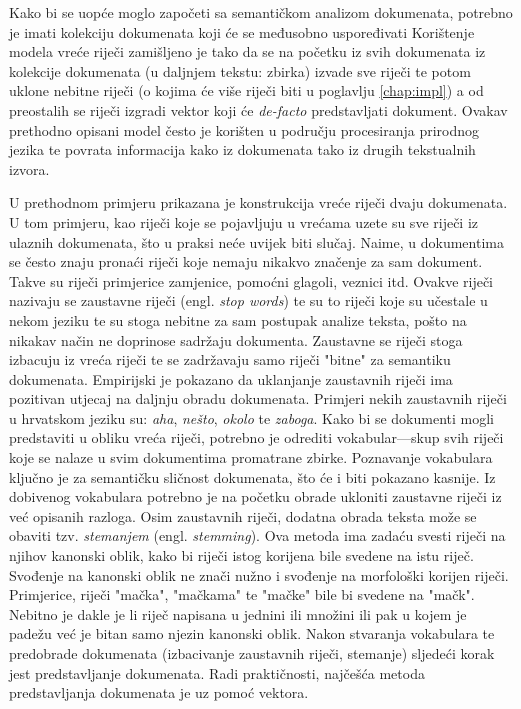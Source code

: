 \documentclass[times, utf8, zavrsni]{fer}
\begin{document}
Kako bi se uopće moglo započeti sa semantičkom analizom dokumenata, potrebno je imati kolekciju dokumenata koji će se međusobno uspoređivati
Korištenje modela vreće riječi zamišljeno je tako da se na početku iz svih dokumenata iz kolekcije dokumenata (u daljnjem tekstu: zbirka) izvade sve riječi te potom uklone nebitne riječi (o kojima će više riječi biti u poglavlju \ref{chap:impl}) a od preostalih se riječi izgradi vektor koji će \textit{de-facto} predstavljati dokument. Ovakav prethodno opisani model često je korišten u području procesiranja prirodnog jezika te povrata informacija kako iz dokumenata tako iz drugih tekstualnih izvora.

U prethodnom primjeru prikazana je konstrukcija vreće riječi dvaju dokumenata. U tom primjeru, kao riječi koje se pojavljuju u vrećama uzete su sve riječi iz ulaznih dokumenata, što u praksi neće uvijek biti slučaj. Naime, u dokumentima se često znaju pronaći riječi koje nemaju nikakvo značenje za sam dokument. Takve su riječi primjerice zamjenice, pomoćni glagoli, veznici itd. Ovakve riječi nazivaju se zaustavne riječi (engl. \textit{stop words}) te su to riječi koje su učestale u nekom jeziku te su stoga nebitne za sam postupak analize teksta, pošto na nikakav način ne doprinose sadržaju dokumenta. Zaustavne se riječi stoga izbacuju iz vreća riječi te se zadržavaju samo riječi "bitne" za semantiku dokumenata. Empirijski je pokazano da uklanjanje zaustavnih riječi ima pozitivan utjecaj na daljnju obradu dokumenata. Primjeri nekih zaustavnih riječi u hrvatskom jeziku su: \textit{aha}, \textit{nešto}, \textit{okolo} te \textit{zaboga}.
Kako bi se dokumenti mogli predstaviti u obliku vreća riječi, potrebno je odrediti vokabular—skup svih riječi koje se nalaze u svim dokumentima promatrane zbirke. Poznavanje vokabulara ključno je za semantičku sličnost dokumenata, što će i biti pokazano kasnije. Iz dobivenog vokabulara potrebno je na početku obrade ukloniti zaustavne riječi iz već opisanih razloga. Osim zaustavnih riječi, dodatna obrada teksta može se obaviti tzv. \textit{stemanjem} (engl. \textit{stemming}). Ova metoda ima zadaću svesti riječi na njihov kanonski oblik, kako bi riječi istog korijena bile svedene na istu riječ. Svođenje na kanonski oblik ne znači nužno i svođenje na morfološki korijen riječi. Primjerice, riječi "mačka", "mačkama" te "mačke" bile bi svedene na "mačk". Nebitno je dakle je li riječ napisana u jednini ili množini ili pak u kojem je padežu već je bitan samo njezin kanonski oblik.
Nakon stvaranja vokabulara te predobrade dokumenata (izbacivanje zaustavnih riječi, stemanje) sljedeći korak jest predstavljanje dokumenata. Radi praktičnosti, najčešća metoda predstavljanja dokumenata je uz pomoć vektora.
\end{document}
